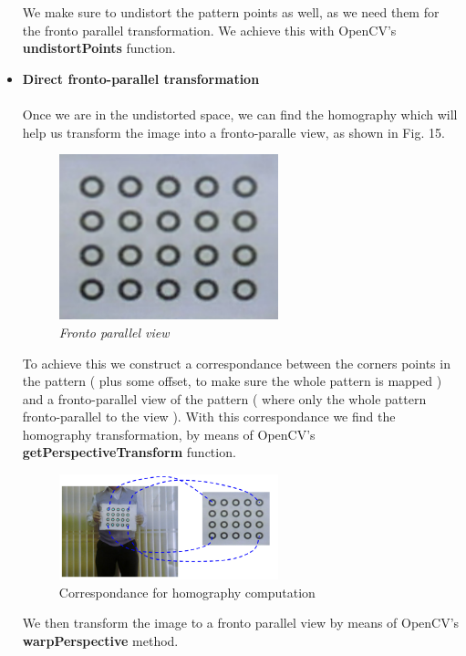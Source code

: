 \documentclass[journal]{IEEEtran}
\begin{document}
\begin{itemize}
        We make sure to undistort the pattern points as well, as we need them for the fronto parallel transformation. We achieve this with OpenCV's \textbf{undistortPoints} function.
        \\
    \item \textbf{Direct fronto-parallel transformation}
        \\
        \\
        Once we are in the undistorted space, we can find the homography which will help us transform the image into a fronto-paralle view, as shown in Fig. 15.

        \begin{figure}[H]
        \centering
        \includegraphics[width=2.5in]{_img/report_4/img_refinement_fronto_view.png}
        \caption{ \textit{ Fronto parallel view } }
        \end{figure}

        To achieve this we construct a correspondance between the corners points in the pattern ( plus some offset, to make sure the whole pattern is mapped ) and a fronto-parallel view of the pattern ( where only the whole pattern fronto-parallel to the view ). With this correspondance we find the homography transformation, by means of OpenCV's \textbf{getPerspectiveTransform} function.

        \begin{figure}[H]
        \centering
        \includegraphics[width=2.5in]{_img/report_4/img_homography.png}
        \caption{Correspondance for homography computation}
        \end{figure}

        We then transform the image to a fronto parallel view by means of OpenCV's \textbf{warpPerspective} method.
        \\


\end{itemize}
\end{document}
